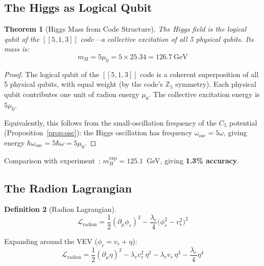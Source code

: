 \documentclass[11pt,a4paper]{article}
\newtheorem{theorem}{Theorem}[section]
\theoremstyle{definition}
\newtheorem{definition}[theorem]{Definition}
\theoremstyle{remark}
\newcommand{\murad}{\mu_0}
\newcommand{\mH}{m_H}
\newcommand{\LL}{\mathcal{L}}
\begin{document}
\subsection{The Higgs as Logical Qubit}
\label{sec:higgs}

\begin{theorem}[Higgs Mass from Code Structure]
\label{thm:higgs}
The Higgs field is the logical qubit of the $[[5,1,3]]$ code---a collective excitation of all 5 physical qubits. Its mass is:
\begin{equation}
\boxed{\mH = 5\murad = 5 \times 25.34 = 126.7~\text{GeV}}
\end{equation}
\end{theorem}

\begin{proof}
The logical qubit of the $[[5,1,3]]$ code is a coherent superposition of all 5 physical qubits, with equal weight (by the code's $\mathbb{Z}_5$ symmetry). Each physical qubit contributes one unit of radion energy $\murad$. The collective excitation energy is $5\murad$.

Equivalently, this follows from the small-oscillation frequency of the $C_5$ potential (Proposition~\ref{prop:osc}): the Higgs oscillation has frequency $\omega_{\mathrm{osc}} = 5\omega$, giving energy $\hbar\omega_{\mathrm{osc}} = 5\hbar\omega = 5\murad$.
\end{proof}

Comparison with experiment~\cite{ATLASHiggs2012,CMSHiggs2012}: $\mH^{\mathrm{exp}} = 125.1$~GeV, giving \textbf{1.3\% accuracy}.

\subsection{The Radion Lagrangian}

\begin{definition}[Radion Lagrangian]
\label{def:Lradion}
\begin{equation}
\LL_{\mathrm{radion}} = \frac{1}{2}(\partial_\mu \phi_r)^2 - \frac{\lambda_r}{4}\big(\phi_r^2 - v_r^2\big)^2
\end{equation}
\end{definition}

Expanding around the VEV ($\phi_r = v_r + \eta$):
\begin{equation}
\LL_{\mathrm{radion}} = \frac{1}{2}(\partial_\mu\eta)^2 - \lambda_r v_r^2\,\eta^2 - \lambda_r v_r\,\eta^3 - \frac{\lambda_r}{4}\eta^4
\end{equation}
\end{document}
